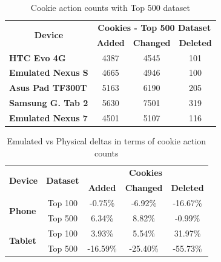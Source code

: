 \documentclass{acm_proc_article-sp}
\begin{document}
\begin{table}[htbp]
  \centering
  \caption{Cookie action counts with Top 500 dataset}
    \begin{tabular}{|c|c|c|c|}
    \hline
    \multicolumn{1}{|c|}{\multirow{2}[4]{*}{\textbf{Device}}} & \multicolumn{3}{|c|}{\textbf{Cookies - Top 500 Dataset}} \\ \cline{2-4}
    \multicolumn{1}{|c|}{} & \multicolumn{1}{|c|}{\textbf{Added}} & \multicolumn{1}{|c|}{\textbf{Changed}} & \multicolumn{1}{|c|}{\textbf{Deleted}} \\ \hline
    \multicolumn{1}{|l|}{\textbf{HTC Evo 4G}} & 4387  & 4545  & 101 \\
    \multicolumn{1}{|l|}{\textbf{Emulated Nexus S}} & 4665  & 4946  & 100 \\
    \multicolumn{1}{|l|}{\textbf{Asus Pad TF300T}} & 5163  & 6190  & 205 \\
    \multicolumn{1}{|l|}{\textbf{Samsung G. Tab 2}} & 5630  & 7501  & 319 \\
    \multicolumn{1}{|l|}{\textbf{Emulated Nexus 7}} & 4501  & 5107  & 116 \\ \hline
    \end{tabular}%
  \label{tab:cookie_counts_500}%
\end{table}%

\begin{table}[htbp]
  \centering
  \caption{Emulated vs Physical deltas in terms of cookie action counts}
    \begin{tabular}{|c|c|c|c|c|}
    \hline
    \multicolumn{1}{|c|}{\multirow{2}[4]{*}{\textbf{Device}}} & \multicolumn{1}{|c|}{\multirow{2}[4]{*}{\textbf{Dataset}}} & \multicolumn{3}{|c|}{\textbf{Cookies}} \\ \cline{3-5}
    \multicolumn{1}{|c|}{} & \multicolumn{1}{|c|}{} & \multicolumn{1}{|c|}{\textbf{Added}} & \multicolumn{1}{|c|}{\textbf{Changed}} & \multicolumn{1}{|c|}{\textbf{Deleted}} \\ \hline
    \multicolumn{1}{|l|}{\multirow{2}[4]{*}{\textbf{Phone}}} & Top 100 & -0.75\% & -6.92\% & -16.67\% \\
    \multicolumn{1}{|l|}{} & Top 500 & 6.34\% & 8.82\% & -0.99\% \\
    \hline
    \multicolumn{1}{|l|}{\multirow{2}[4]{*}{\textbf{Tablet}}} & Top 100 & 3.93\% & 5.54\% & 31.97\% \\
    \multicolumn{1}{|l|}{} & Top 500 & -16.59\% & -25.40\% & -55.73\% \\ \hline
    \end{tabular}%
  \label{tab:cookie_deltas}%
\end{table}%
\end{document}
